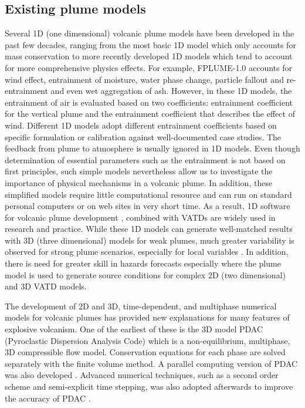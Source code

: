 \documentclass[journal abbreviation, manuscript]{copernicus}
\begin{document}
\subsection{Existing plume models}
Several 1D (one dimensional) volcanic plume models have been developed in the past few decades, ranging from the most basic 1D model \citep{woods1988fluid} which only accounts for mass conservation to more recently developed 1D models  \citep{bursik2001effect, mastin2007user, degruyter2012improving, woodhouse2013interaction, devenish2013using, de2015plume, folch2016fplume, pouget2016sensitivity} which tend to account for more comprehensive physics effects. 
For example, FPLUME-1.0 \citep{folch2016fplume} accounts for wind effect, entrainment of moisture, water phase change, particle fallout and re-entrainment and even wet aggregation of ash. However, in these 1D models, the entrainment of air is evaluated based on two coefficients: entrainment coefficient for the vertical plume and the entrainment coefficient that describes the effect of wind. Different 1D models adopt different entrainment coefficients based on specific formulation or calibration against well-documented case studies. The feedback from plume to atmosphere is usually ignored in 1D models. Even though determination of essential parameters such as the entrainment is not based on first principles, such simple models nevertheless allow us to investigate the importance of physical mechanisms in a volcanic plume. In addition, these simplified models require little computational resource and can run on standard personal computers or on web sites in very short time. As a result, 1D software for volcanic plume development \citep[such as][]{267, 1194, 3541}, combined with VATDs \citep[such as][]{114, draxler2015hysplit} are widely used in research and practice. While these 1D models can generate well-matched results with 3D (three dimensional) models for weak plumes, much greater variability is observed for strong plume scenarios, especially for local variables \citep{costa2016results}. In addition, there is need for greater skill in hazards forecasts especially where the plume model is used to generate source conditions for complex 2D (two dimensional) and 3D VATD models.

The development of 2D and 3D, time-dependent, and multiphase numerical models for volcanic plumes has provided new explanations for many features of explosive volcanism. One of the earliest of these is the 3D model PDAC (Pyroclastic Dispersion Analysis Code) \citep{neri2003multiparticle}  which is a non-equilibrium, multiphase, 3D compressible flow model. Conservation equations for each phase are solved separately with the finite volume method. A parallel computing version of PDAC was also developed \citep{ongaro2007parallel}. Advanced numerical techniques, such as a second order scheme and semi-explicit time stepping, was also adopted afterwards to improve the accuracy of PDAC \citep{carcano2013semi}. 
\end{document}
